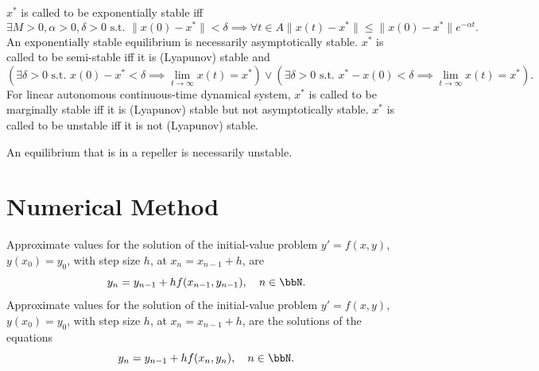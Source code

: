 \documentclass[a4paper,12pt]{report}
\begin{document}
$x^*$ is called to be exponentially stable iff
\[\exists M>0,\alpha>0,\delta>0\text{\ s.t.\ }\|x(0)-x^*\|<\delta\implies\forall t\in A\|x(t)-x^*\|\leq\|x(0)-x^*\|e^{-\alpha t}.\]
An exponentially stable equilibrium is necessarily asymptotically stable.
$x^*$ is called to be semi-stable iff it is (Lyapunov) stable and
\[(\exists\delta>0\text{\ s.t.\ }x(0)-x^*<\delta\implies\lim_{t\to\infty}x(t)=x^*)\lor (\exists\delta>0\text{\ s.t.\ }x^*-x(0)<\delta\implies\lim_{t\to\infty}x(t)=x^*).\]
For linear autonomous continuous-time dynamical system, $x^*$ is called to be marginally stable iff it is (Lyapunov) stable but not asymptotically stable.
$x^*$ is called to be unstable iff it is not (Lyapunov) stable.

An equilibrium that is in a repeller is necessarily unstable.
\section{Numerical Method}
Approximate values for the solution of the initial-value problem $y'=f(x,y)$, $y(x_0)=y_0$, with step size $h$, at $x_n=x_{n-1}+h$, are
\[y_n=y_{n-1}+hf(x_{n-1},y_{n-1}),\quad n\in\bbN.\]
Approximate values for the solution of the initial-value problem $y'=f(x,y)$, $y(x_0)=y_0$, with step size $h$, at $x_n=x_{n-1}+h$, are the solutions of the equations
\[y_n=y_{n-1}+hf(x_n,y_n),\quad n\in\bbN.\]
\end{document}
